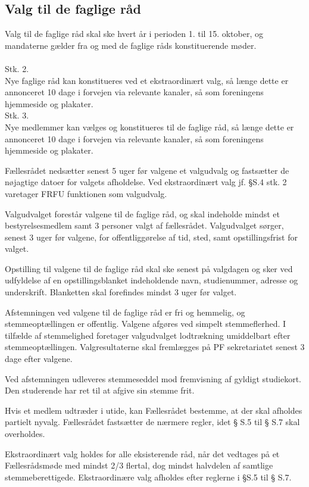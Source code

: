 \begin{list}
\subsection{Valg til de faglige råd}
\item Valg til de faglige råd skal ske hvert år i perioden 1. til 15. oktober, og mandaterne gælder fra og med de faglige råds konstituerende møder.\\
\\
Stk. 2. \\
Nye faglige råd kan konstitueres ved et ekstraordinært valg, så længe dette er annonceret 10 dage i forvejen via relevante kanaler, så som foreningens hjemmeside og plakater.
\\Stk. 3. \\
Nye medlemmer kan vælges og konstitueres til de faglige råd, så længe dette er annonceret 10 dage i forvejen via relevante kanaler, så som foreningens hjemmeside og plakater.
\item Fællesrådet nedsætter senest 5 uger før valgene et valgudvalg og fastsætter de nøjagtige datoer for valgets afholdelse. Ved ekstraordinært valg jf. §S.4 stk. 2 varetager FRFU funktionen som valgudvalg.
\item Valgudvalget forestår valgene til de faglige råd, og skal indeholde mindst et bestyrelsesmedlem samt 3 personer valgt af fællesrådet. Valgudvalget sørger, senest 3 uger før valgene, for offentliggørelse af tid, sted, samt opstillingsfrist for valget.
\item Opstilling til valgene til de faglige råd skal ske senest på valgdagen og sker ved udfyldelse af en opstillingsblanket indeholdende navn, studienummer, adresse og underskrift. Blanketten skal forefindes mindst 3 uger før valget.
\item Afstemningen ved valgene til de faglige råd er fri og hemmelig, og stemmeoptællingen er offentlig. Valgene afgøres ved simpelt stemmeflerhed. I tilfælde af stemmelighed foretager valgudvalget lodtrækning umiddelbart efter stemmeoptællingen. Valgresultaterne skal fremlægges på PF sekretariatet senest 3 dage efter valgene.
\item Ved afstemningen udleveres stemmeseddel mod fremvisning af gyldigt studiekort. Den studerende har ret til at afgive sin stemme frit.
\item Hvis et medlem udtræder i utide, kan Fællesrådet bestemme, at der skal afholdes partielt nyvalg. Fællesrådet fastsætter de nærmere regler, idet § S.5 til § S.7 skal overholdes.
\item Ekstraordinært valg holdes for alle eksisterende råd, når det vedtages på et Fællesrådsmøde med mindst 2/3 flertal, dog mindst halvdelen af samtlige stemmeberettigede. Ekstraordinære valg afholdes efter reglerne i §S.5 til § S.7.


\end{list}
